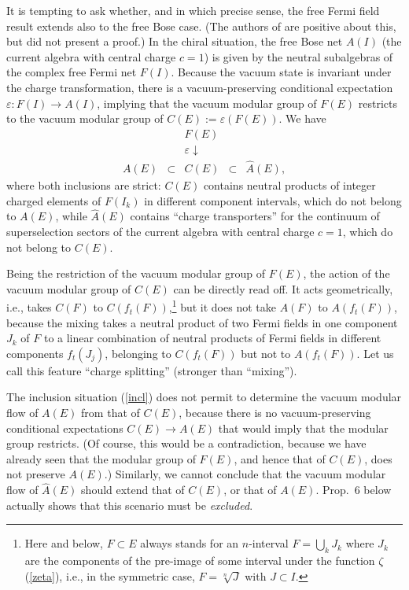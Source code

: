 \documentclass[12pt]{article}
\def\eps{\varepsilon}
\def\be{\begin{equation}} \def\bea{\begin{eqnarray}}
\def\ba{\begin{array}} \def\eea{\end{eqnarray}}
\def\ee{\end{equation}}\def\ea{\end{array}}
\begin{document}
It is tempting to ask whether, and in which precise sense, the free
Fermi field result extends also to the free Bose case. (The authors of
\cite{CH} are positive about this, but did not present a proof.) In
the chiral situation, the free Bose net $A(I)$ (the current algebra
with central charge $c=1$) is given by the neutral subalgebras of the
complex free Fermi net $F(I)$. Because the vacuum state is invariant
under the charge transformation, there is a vacuum-preserving
conditional expectation $\eps:F(I)\to A(I)$, implying that the vacuum
modular group of $F(E)$ restricts to the vacuum modular group of
$C(E):=\eps(F(E))$. We have 
\be
\label{incl}
   \ba{ccccc}&& F(E)&& \\ &&\eps\downarrow\quad&& \\ A(E)&\subset
   & C(E)& \subset & \widehat A(E),\ea 
\ee
where both inclusions are strict: $C(E)$ contains neutral products of
integer charged elements of $F(I_k)$ in different component intervals,
which do not belong to $A(E)$, while $\widehat A(E)$ contains ``charge
transporters'' \cite{BMT,KLM} for the continuum of superselection
sectors of the current algebra with central charge $c=1$, which do not
belong to $C(E)$.  

Being the restriction of the vacuum modular group of $F(E)$, 
the action of the vacuum modular group of $C(E)$ can be directly read
off. It acts geometrically, i.e., takes 
$C(F)$ to $C(f_t(F))$,\footnote{Here and below, $F\subset E$ always
  stands for an $n$-interval $F=\bigcup_k J_k$ where $J_k$ are the
  components of the pre-image of some interval under the function
  $\zeta$ (\ref{zeta}), i.e., in the symmetric case, $F=\sqrt[n]J$
  with $J\subset I$.} but it does not take $A(F)$ to $A(f_t(F))$,
because the mixing takes a neutral product of two Fermi fields in one
component $J_k$ of $F$ to a linear combination of neutral products of
Fermi fields in different components $f_t(J_j)$, belonging to
$C(f_t(F))$ but not to $A(f_t(F))$. Let us call this feature ``charge
splitting'' (stronger than ``mixing'').  

The inclusion situation (\ref{incl}) does not permit to determine the
vacuum modular flow of $A(E)$ from that of $C(E)$, because there is no
vacuum-preserving conditional expectations $C(E)\to A(E)$ that would
imply that the modular group restricts. (Of course, this would be a
contradiction, because we have already seen that the modular group of
$F(E)$, and hence that of $C(E)$, does not preserve $A(E)$.)
Similarly, we cannot conclude that the vacuum modular flow of 
$\widehat A(E)$ should extend that of $C(E)$, or that of $A(E)$. 
Prop.\ 6 below actually shows that this scenario must be {\em excluded}. 
\end{document}
